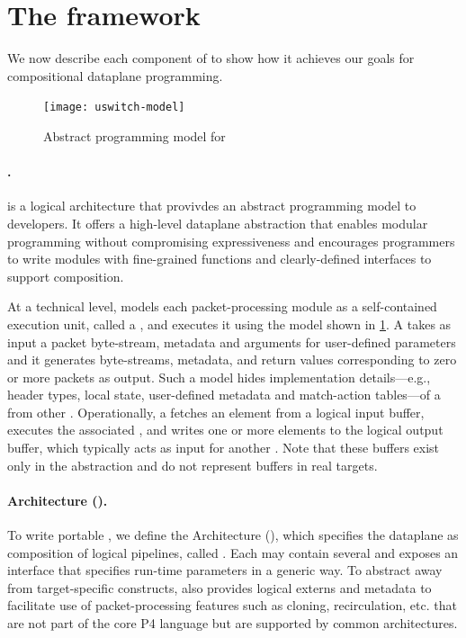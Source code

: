 \documentclass[letterpaper,twocolumn,10pt]{article}
\begin{document}
\section{The \ulang framework}
\label{sec:microp4}
We now describe each component of \ulang to show how it achieves
our goals for compositional dataplane programming.
\begin{figure}[!tb]
    \centering
    \texttt{[image: uswitch-model]}
    \caption{Abstract programming model for \uswitch}
    \label{fig:uswitch}
\end{figure}


\paragraph{\uswitch.}
\uswitch is a logical architecture that provivdes an abstract
programming model to developers. It offers a high-level dataplane
abstraction that enables modular programming without compromising
expressiveness and encourages programmers to write modules with
fine-grained functions and clearly-defined interfaces to support
composition.

At a technical level, \uswitch models each packet-processing module as
a self-contained execution unit, called a \emph{\uprogram}, and
executes it using the model shown in \cref{fig:uswitch}. A \uprogram
takes as input a packet byte-stream, metadata and arguments for
user-defined parameters and it generates byte-streams, metadata, and
return values corresponding to zero or more packets as output. Such a
model hides implementation details---e.g., header types, local state,
user-defined metadata and match-action tables---of a \uprogram from
other \uprograms. Operationally, a \uswitch fetches an element from a
logical input buffer, executes the associated \uprogram, and writes
one or more elements to the logical output buffer, which typically
acts as input for another \uprogram. Note that these buffers exist
only in the abstraction and do not represent buffers in real targets.

\paragraph{\uswitch Architecture (\uarch).}
To write portable \uprograms, we define the \uswitch Architecture
(\uarch), which specifies the dataplane as composition of logical
pipelines, called \emph{\upipeline}. Each \upipeline may contain
several \uprograms and exposes an interface that specifies run-time
parameters in a generic way. To abstract away from target-specific
constructs, \uarch also provides logical externs and metadata to
facilitate use of packet-processing features such as cloning,
recirculation, etc. that are not part of the core P4 language but are
supported by common architectures.
\end{document}
